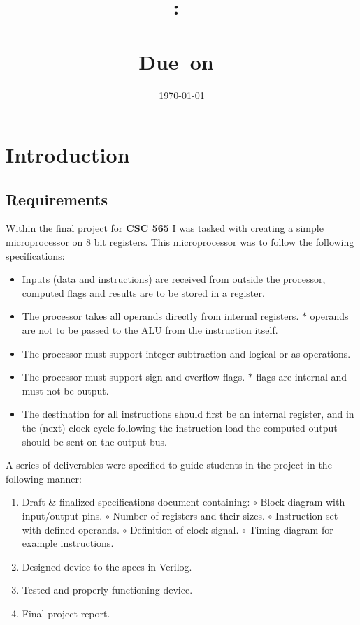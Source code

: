 \documentclass{article}
\title{
    \vspace{2in}
    \textmd{\textbf{\hmwkClass:\ \\ \hmwkTitle}}\\
    \normalsize\vspace{0.1in}\small{Due\ on\ \hmwkDueDate}\\
    \vspace{0.1in}\Large{\textit{\paprTitle}}
    \vspace{3in}
}
\author{\hmwkAuthorName}
\date{\today}
\begin{document}
\maketitle

\pagebreak

\tableofcontents
\listoftables
\listoffigures

\newpage

\section{Introduction}

\subsection{Requirements}
Within the final project for \textbf{CSC 565} I was tasked with creating a simple microprocessor on 8 bit registers.
This microprocessor was to follow the following specifications:
\begin{itemize}
    \item[\(\diamond\)] Inputs (data and instructions) are received from outside the processor, computed flags and results are to be stored in a register.
    \item[\(\diamond\)] The processor takes all operands directly from internal registers.
    \subitem \(\ast\) operands are not to be passed to the ALU from the instruction itself.
    \item[\(\diamond\)] The processor must support integer subtraction and logical or as operations.
    \item[\(\diamond\)] The processor must support sign and overflow flags.
    \subitem \(\ast\) flags are internal and must not be output.
    \item[\(\diamond\)] The destination for all instructions should first be an internal register, and in the (next) clock cycle following the instruction load the computed output should be sent on the output bus.
\end{itemize}

\noindent
A series of deliverables were specified to guide students in the project in the following manner:
\begin{enumerate}
    \item Draft \& finalized specifications document containing:
    \subitem \(\circ\) Block diagram with input/output pins.
    \subitem \(\circ\) Number of registers and their sizes.
    \subitem \(\circ\) Instruction set with defined operands.
    \subitem \(\circ\) Definition of clock signal.
    \subitem \(\circ\) Timing diagram for example instructions.
    \item Designed device to the specs in Verilog.
    \item Tested and properly functioning device.
    \item Final project report.
\end{enumerate}
\end{document}
